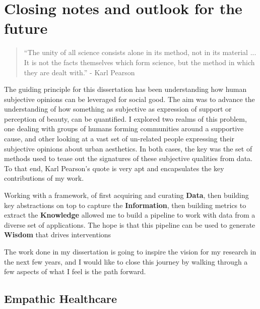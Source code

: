 \chapter{ Closing notes and outlook for the future }


\graphicspath{{Chapter6/plots/}}

\begin{quote}
    ``The unity of all science consists alone in its method, not in its material ... It is not the facts themselves which form science, but the method in which they are dealt with.'' - Karl Pearson
\end{quote}


The guiding principle for this dissertation has been understanding how human subjective opinions can be leveraged for social good. The aim was to advance the understanding of how something as subjective as expression of support or perception of beauty, can be quantified. 
I explored two realms of this problem, one dealing with groups of humans forming communities around a supportive cause, and other looking at a vast set of un-related people expressing their subjective opinions about urban aesthetics. In both cases, the key was the set of methods used to tease out the signatures of these subjective qualities from data. To that end, Karl Pearson's quote is very apt and encapsulates the key contributions of my work.

Working with a framework, of first acquiring and curating \textbf{Data}, then building key abstractions on top to capture the \textbf{Information}, then building metrics to extract the \textbf{Knowledge} allowed me to build a pipeline to work with data from a diverse set of applications. The hope is that this pipeline can be used to generate \textbf{Wisdom} that drives interventions

The work done in my dissertation is going to inspire the vision for my research in the next few years, and I would like to close this journey by walking through a few aspects of what I feel is the path forward.

\section{Empathic Healthcare}

